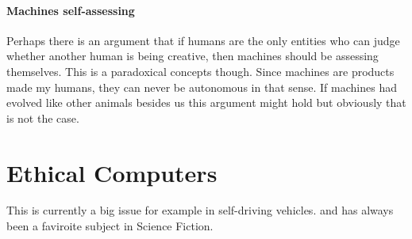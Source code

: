 \documentclass[11pt]{thesis} %
\begin{document}
\paragraph{Machines self-assessing}
Perhaps there is an argument that if humans are the only entities who can judge whether another human is being creative, then machines should be assessing themselves. This is a paradoxical concepts though. Since machines are products made my humans, they can never be autonomous in that sense. If machines had evolved like other animals besides us this argument might hold but obviously that is not the case.


\section{Ethical Computers}

This is currently a big issue for example in self-driving vehicles.
and has always been a faviroite subject in Science Fiction.
\end{document}
